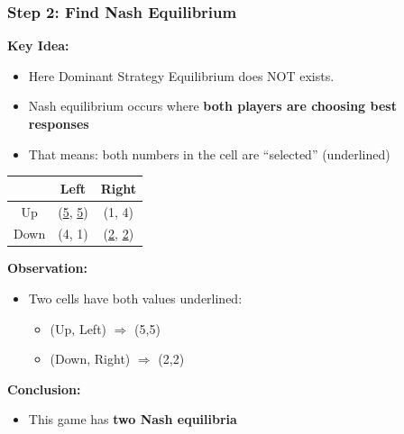 \begin{frame}[fragile]\frametitle{Step 2: Find Nash Equilibrium}

\textbf{Key Idea:}
\begin{itemize}
  \item Here Dominant Strategy Equilibrium does NOT exists.
  \item Nash equilibrium occurs where \textbf{both players are choosing best responses}
  \item That means: both numbers in the cell are “selected” (underlined)
\end{itemize}

\vspace{6pt}

\begin{center}
\begin{tabular}{|c|c|c|}
  \hline
  & Left & Right \\
  \hline
  Up & (\underline{5}, \underline{5}) & (1, 4) \\
  \hline
  Down & (4, 1) & (\underline{2}, \underline{2}) \\
  \hline
\end{tabular}
\end{center}

\vspace{6pt}

\textbf{Observation:}
\begin{itemize}
  \item Two cells have both values underlined:
  \begin{itemize}
    \item (Up, Left) $\Rightarrow$ (5,5)
    \item (Down, Right) $\Rightarrow$ (2,2)
  \end{itemize}
\end{itemize}

\vspace{2pt}

\textbf{Conclusion:}
\begin{itemize}
  \item This game has \textbf{two Nash equilibria}
\end{itemize}

\end{frame}

